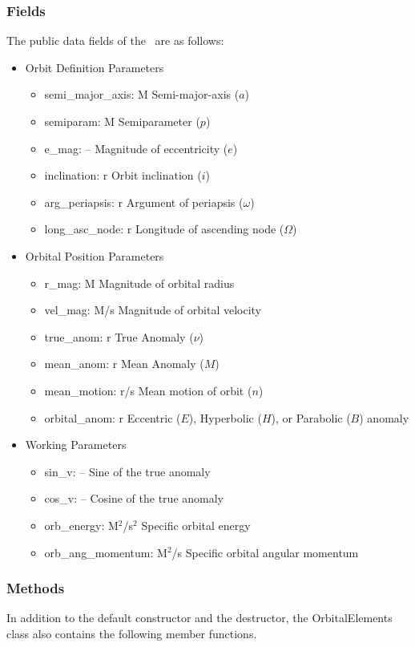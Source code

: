 \subsubsection{Fields}
The public data fields of the \OrbitalElement\ are as follows:
\begin{itemize}
   \item Orbit Definition Parameters
\begin{itemize}
\item semi\_major\_axis: M     Semi-major-axis ($a$)
\item semiparam: M     Semiparameter ($p$)
\item e\_mag: --   Magnitude of eccentricity ($e$)
\item inclination: r     Orbit inclination ($i$)
\item arg\_periapsis: r     Argument of periapsis ($\omega$)
\item long\_asc\_node: r     Longitude of ascending node ($\Omega$)
\end{itemize}
   \item Orbital Position Parameters
\begin{itemize}
\item r\_mag: M     Magnitude of orbital radius
\item vel\_mag: M/s   Magnitude of orbital velocity
\item true\_anom: r     True Anomaly ($\nu$)
\item mean\_anom: r     Mean Anomaly ($M$)
\item mean\_motion: r/s   Mean motion of orbit ($n$)
\item orbital\_anom: r     Eccentric ($E$), Hyperbolic ($H$), or
                                       Parabolic ($B$) anomaly
\end{itemize}
   \item Working Parameters
\begin{itemize}
\item sin\_v: --    Sine of the true anomaly
\item cos\_v: --    Cosine of the true anomaly
\item orb\_energy: M$^2$/s$^2$ Specific orbital energy
\item orb\_ang\_momentum: M$^2$/s  Specific orbital angular momentum
\end{itemize}
\end{itemize}

\subsubsection{Methods}
In addition to the default constructor and the destructor,
the OrbitalElements class also contains the following member functions.

